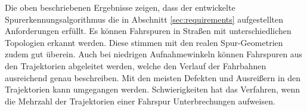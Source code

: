 
Die oben beschriebenen Ergebnisse zeigen, dass der entwickelte Spurerkennungsalgorithmus die in
Abschnitt \ref{sec:requirements} aufgestellten Anforderungen erfüllt.
Es können Fahrspuren in Straßen mit unterschiedlichen Topologien erkannt werden. Diese stimmen
mit den realen Spur-Geometrien zudem gut überein. Auch bei niedrigen Aufnahmewinkeln können
Fahrspuren aus den Trajektorien abgeleitet werden, welche den Verlauf der Fahrbahnen ausreichend genau
beschreiben. Mit den meisten Defekten und Ausreißern in den Trajektorien kann umgegangen werden.
Schwierigkeiten hat das Verfahren, wenn die Mehrzahl der Trajektorien einer Fahrspur
Unterbrechungen aufweisen.
